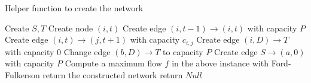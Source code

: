 \documentclass[11pt]{article}
\begin{document}

\begin{algorithm}[H]
\caption{Helper function to create the network}
\begin{algorithmic}[1]
\State Create $S,T$
\State Create node $(i,t)$
 \State Create edge $(i,t-1)\to(i,t)$ with capacity $P$
\EndIf
\EndFor
\EndFor
{}
\State Create edge $(i,t)\to(j,t+1)$ with capacity $c_{i,j}$
\EndFor
\EndFor
{}
\State Create edge $(i,D)\to T$ with capacity 0
\EndFor
\State Change edge $(b,D)\to T$ to capacity $P$
\State Create edge $S\to(a,0)$ with capacity $P$
\State Compute a maximum flow $f$ in the above instance with Ford-Fulkerson
 \State return the constructed network
\Else \State return $Null$ 
\EndIf
\EndFunction
\end{algorithmic}
\end{algorithm}
\end{document}

